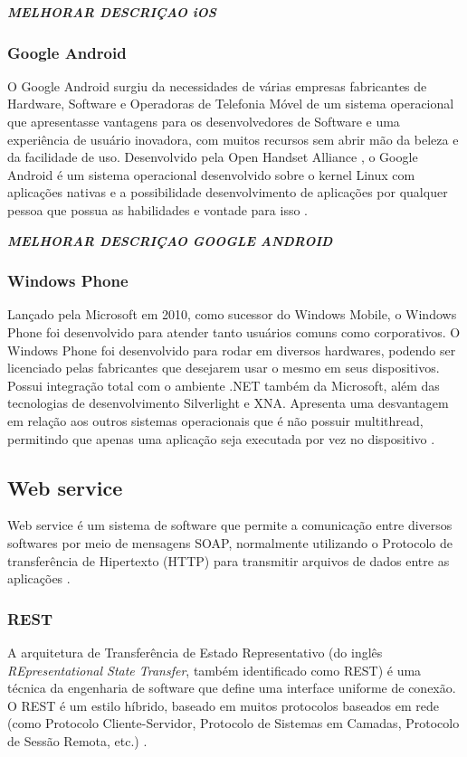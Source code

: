 \emph{\bf{MELHORAR DESCRIÇAO iOS}}

\subsubsection{Google Android}
O Google Android surgiu da necessidades de várias empresas fabricantes de Hardware, Software e Operadoras de Telefonia Móvel de um sistema operacional que apresentasse vantagens para os desenvolvedores de Software e uma experiência de usuário inovadora, com muitos recursos sem abrir mão da beleza e da facilidade de uso. Desenvolvido pela Open Handset Alliance \cite{OHA}, o Google Android é um sistema operacional desenvolvido sobre o kernel Linux com aplicações nativas e a possibilidade desenvolvimento de aplicações por qualquer pessoa que possua as habilidades e vontade para isso \cite{lechetagoogle}.

\emph{\bf{MELHORAR DESCRIÇAO GOOGLE ANDROID}}

\subsubsection{Windows Phone}
Lançado pela Microsoft em 2010, como sucessor do Windows Mobile, o Windows Phone foi desenvolvido para atender tanto usuários comuns como corporativos. O Windows Phone foi desenvolvido para rodar em diversos hardwares, podendo ser licenciado pelas fabricantes que desejarem usar o mesmo em seus dispositivos. Possui integração total com o ambiente .NET também da Microsoft, além das tecnologias de desenvolvimento Silverlight e XNA. Apresenta uma desvantagem em relação aos outros sistemas operacionais que é não possuir multithread, permitindo que apenas uma aplicação seja executada por vez no dispositivo \cite{AvaliacaoComparativaSOMoveis}.

\subsection{Web service}
Web service é um sistema de software que permite a comunicação entre diversos softwares por meio de mensagens SOAP, normalmente utilizando o Protocolo de transferência de Hipertexto (HTTP) para transmitir arquivos de dados entre as aplicações \cite{W3C}.
\subsubsection{REST}
A arquitetura de Transferência de Estado Representativo (do inglês \emph{REpresentational State Transfer}, também identificado como REST) é uma técnica da engenharia de software que define uma interface uniforme de conexão. O REST é um estilo híbrido, baseado em muitos protocolos baseados em rede (como Protocolo Cliente-Servidor, Protocolo de Sistemas em Camadas, Protocolo de Sessão Remota, etc.) \cite{RESTFielding}.


